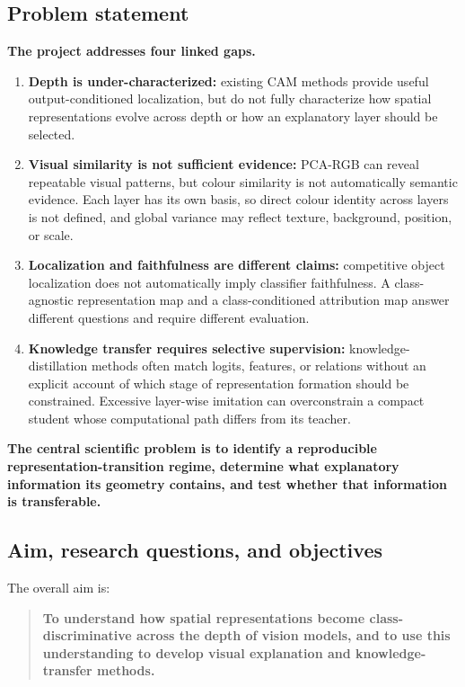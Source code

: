 \subsection{Problem statement}

\textbf{The project addresses four linked gaps.}

\begin{enumerate}[leftmargin=*]
    \item \textbf{Depth is under-characterized:} existing CAM methods provide
    useful output-conditioned localization, but do not fully characterize how
    spatial representations evolve across depth or how an explanatory layer
    should be selected.
    \item \textbf{Visual similarity is not sufficient evidence:} PCA-RGB can
    reveal repeatable visual patterns, but colour similarity is not
    automatically semantic evidence. Each layer has its own basis, so direct
    colour identity across layers is not defined, and global variance may
    reflect texture, background, position, or scale.
    \item \textbf{Localization and faithfulness are different claims:}
    competitive object localization does not automatically imply classifier
    faithfulness. A class-agnostic representation map and a class-conditioned
    attribution map answer different questions and require different
    evaluation.
    \item \textbf{Knowledge transfer requires selective supervision:}
    knowledge-distillation methods often match logits, features, or relations
    without an explicit account of which stage of representation formation
    should be constrained. Excessive layer-wise imitation can overconstrain a
    compact student whose computational path differs from its teacher.
\end{enumerate}

\textbf{The central scientific problem is to identify a reproducible
representation-transition regime, determine what explanatory information its
geometry contains, and test whether that information is transferable.}

\subsection{Aim, research questions, and objectives}

The overall aim is:

\begin{quote}
\textbf{To understand how spatial representations become class-discriminative
across the depth of vision models, and to use this understanding to develop
visual explanation and knowledge-transfer methods.}
\end{quote}

